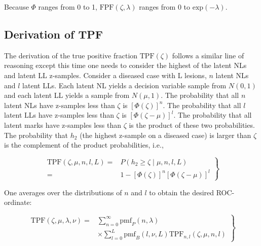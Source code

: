 \documentclass[
]{book}
\begin{document}
Because \(\Phi\) ranges from 0 to 1, \(\text{FPF}\left (\zeta , \lambda\right )\) ranges from 0 to \(\text{exp} \left ( -\lambda \right )\).

\hypertarget{rsm-predictions-roc-curve-tpf}{%
\subsection{Derivation of TPF}\label{rsm-predictions-roc-curve-tpf}}

The derivation of the true positive fraction \(\text{TPF}(\zeta)\) follows a similar line of reasoning except this time one needs to consider the highest of the latent NLs and latent LL z-samples. Consider a diseased case with L lesions, \(n\) latent NLs and \(l\) latent LLs. Each latent NL yields a decision variable sample from \(N(0,1)\) and each latent LL yields a sample from \(N(\mu,1)\). The probability that all \(n\) latent NLs have z-samples less than \(\zeta\) is \([\Phi(\zeta)]^n\). The probability that all \(l\) latent LLs have z-samples less than \(\zeta\) is \([\Phi(\zeta - \mu)]^l\). The probability that all latent marks have z-samples less than \(\zeta\) is the product of these two probabilities. The probability that \(h_2\) (the highest z-sample on a diseased case) is larger than \(\zeta\) is the complement of the product probabilities, i.e.,

\begin{equation}
\left. 
\begin{aligned}
\text{TPF}\left ( \zeta, \mu, n, l, L \right ) =& 
P\left ( h_2 \geq \zeta \mid \mu, n, l, L \right ) \\
=& 1 - \left [ \Phi\left ( \zeta \right ) \right ]^n \left [ \Phi\left ( \zeta - \mu\right ) \right ]^l
\end{aligned}
\right \}
\label{eq:rsm-predictions-tpf-vary-nl}
\end{equation}

One averages over the distributions of \(n\) and \(l\) to obtain the desired ROC-ordinate:

\begin{equation}
\left.
\begin{aligned}
\text{TPF}\left ( \zeta, \mu, \lambda, \nu \right ) =& \sum_{n=0}^{\infty} \text{pmf}_{P}(n,\lambda) \\
&\times \sum_{l=0}^{L} \text{pmf}_{B}(l,\nu,L) \text{TPF}_{n,l}\left ( \zeta, \mu, n, l \right )
\end{aligned}
\right \}
\label{eq:rsm-predictions-tpf-double-summation}
\end{equation}
\end{document}
